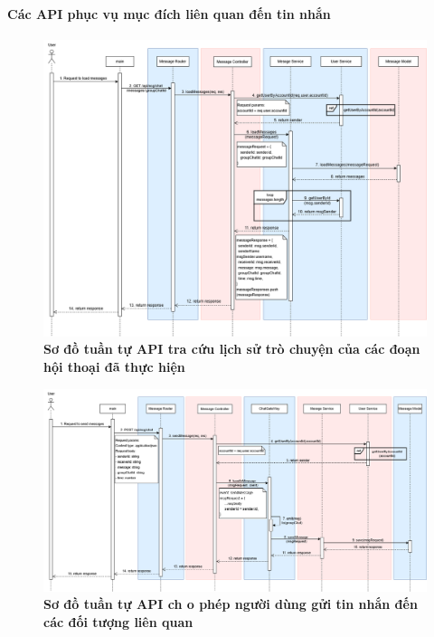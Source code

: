 \paragraph{Các API phục vụ mục đích liên quan đến tin nhắn}
\mbox{}
\begin{figure}[H]
	\centering
	\includegraphics[width=16cm]{Images/api_sequence/chat/loadMessages.drawio.png}
	\caption[Sơ đồ tuần tự API tra cứu lịch sử trò chuyện của các đoạn hội thoại đã thực hiện]{\bfseries \fontsize{12pt}{0pt}\selectfont Sơ đồ tuần tự API tra cứu lịch sử trò chuyện của các đoạn hội thoại đã thực hiện}
	\label{sequence_diagram_load_chat}
\end{figure}

\begin{figure}[H]
	\centering
	\includegraphics[width=16cm]{Images/api_sequence/chat/sendMessage.drawio.png}
	\caption[Sơ đồ tuần tự API ch o phép người dùng gửi tin nhắn đến các đối tượng liên quan]{\bfseries \fontsize{12pt}{0pt}\selectfont Sơ đồ tuần tự API ch o phép người dùng gửi tin nhắn đến các đối tượng liên quan}
	\label{sequence_diagram_send_chat}
\end{figure}

